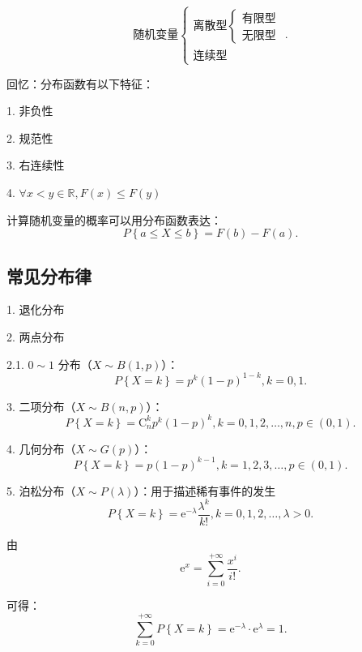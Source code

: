 \[
    \text{随机变量}\begin{cases}
        \text{离散型}\begin{cases}
            \text{有限型}\\
            \text{无限型}
        \end{cases}\\
        \text{连续型}
    \end{cases}
.\] 
\begin{notation}
    回忆：分布函数有以下特征：

    1. 非负性

    2. 规范性

    3. 右连续性

    4. $\forall x<y\in \mathbb{R}, F\left( x \right) \le F\left( y \right) $ 

    计算随机变量的概率可以用分布函数表达：
    \[
        P\left\{ a\le X\le b \right\} =F\left( b \right) -F\left( a \right) 
    .\]
\end{notation}
\subsection{常见分布律}%
\label{sub:常见分布律}
1. 退化分布

2. 两点分布

2.1. $0 \sim 1$ 分布（$X\sim B\left( 1,p \right) $）：\[
    P\left\{ X=k \right\} =p^{k}\left( 1-p \right) ^{1-k}, k=0,1
.\] 

3. 二项分布（$X\sim B\left( n,p \right) $）：\[
    P\left\{ X=k \right\} =\mathrm{C}_{n}^{k}p^{k}\left( 1-p \right) ^{k}, k=0,1,2,\ldots,n, p \in \left( 0,1 \right) 
.\] 

4. 几何分布（$X\sim G\left( p \right) $）：\[
    P\left\{ X=k \right\} =p\left( 1-p \right) ^{k-1}, k=1,2,3,\ldots, p \in\left( 0,1 \right) 
.\] 

5. 泊松分布（$X\sim P\left( \lambda \right) $）：用于描述稀有事件的发生\[
    P\left\{ X=k \right\} =\mathrm{e}^{-\lambda}\frac{\lambda^{k}}{k!}, k=0,1,2,\ldots,\lambda>0
.\] 
\begin{notation}
    由\[
        \mathrm{e}^{x}=\sum_{i=0}^{+\infty} \frac{x^{i}}{i!}
    .\] 
    
    可得：
    \[
        \sum_{k=0}^{+\infty} P\left\{ X=k \right\} =\mathrm{e}^{-\lambda}\cdot \mathrm{e}^{\lambda}=1
    .\] 
\end{notation}

